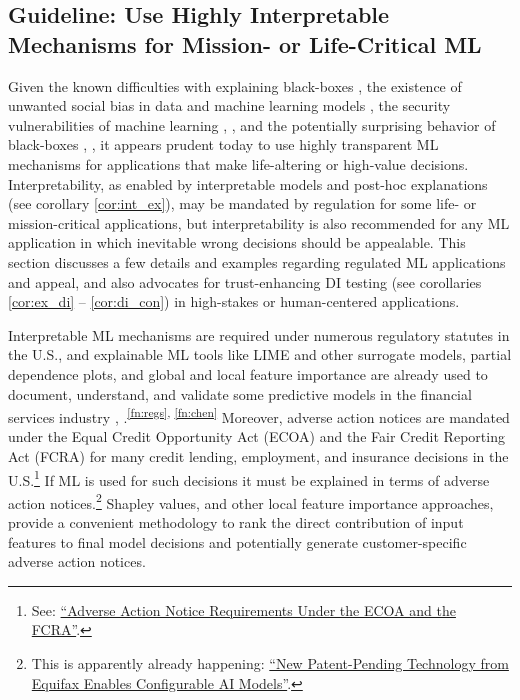 \documentclass{article}
\begin{document}
\subsection{Guideline: Use Highly Interpretable Mechanisms for Mission- or Life-Critical ML} \label{sec:white_box}

Given the known difficulties with explaining black-boxes \cite{please_stop}, the existence of unwanted social bias in data and machine learning models \cite{fairmlbook}, the security vulnerabilities of machine learning \cite{membership_inference},  \cite{model_stealing}, and the potentially surprising behavior of black-boxes \cite{easily_fooled}, \cite{intriguing_properties}, it appears prudent today to use highly transparent ML mechanisms for  applications that make life-altering or high-value decisions. Interpretability, as enabled by interpretable models and post-hoc explanations (see corollary \ref{cor:int_ex}), may be mandated by regulation for some life- or mission-critical applications, but interpretability is also recommended for any ML application in which inevitable wrong decisions should be appealable. This section discusses a few details and examples regarding regulated ML applications and appeal, and also advocates for trust-enhancing DI testing (see corollaries \ref{cor:ex_di} -- \ref{cor:di_con}) in high-stakes or human-centered applications.  

Interpretable ML mechanisms are required under numerous regulatory statutes in the U.S., and explainable ML tools like LIME and other surrogate models, partial dependence plots, and global and local feature importance are already used to document, understand, and validate some predictive models in the financial services industry \cite{lime-sup}, \cite{wf_xnn}.\textsuperscript{\ref{fn:regs}, \ref{fn:chen}} Moreover, adverse action notices are mandated under the Equal Credit Opportunity Act (ECOA) and the Fair Credit Reporting Act (FCRA) for many credit lending, employment, and insurance decisions in the U.S.\footnote{See: \scriptsize{\href{https://consumercomplianceoutlook.org/2013/second-quarter/adverse-action-notice-requirements-under-ecoa-fcra/}{``Adverse Action Notice Requirements Under the ECOA and the FCRA''}.}} If ML is used for such decisions it must be explained in terms of adverse action notices.\footnote{\scriptsize{This is apparently already happening: \href{https://www.prnewswire.com/news-releases/new-patent-pending-technology-from-equifax-enables-configurable-ai-models-300701153.html}{``New Patent-Pending Technology from Equifax Enables Configurable AI Models''}.}} Shapley values, and other local feature importance approaches, provide a convenient methodology to rank the direct contribution of input features to final model decisions and potentially generate customer-specific adverse action notices. 
\end{document}
